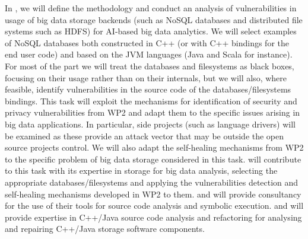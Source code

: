 \begin{Workpackage}{\thewpno}
\begin{Task}
\TaskResults{%
\ref{del:bigdata1},
\ref{del:bigdata2},
\ref{del:bigdata3}
}
\TaskHeader{}
In \theTask, we will define the methodology and conduct an analysis of vulnerabilities in usage of big data storage backends (such as NoSQL databases and distributed file systems such as HDFS) for AI-based big data analytics.  We will select examples of NoSQL databases both constructed in C++ (or with C++ bindings for the end user code) and based on the JVM languages (Java and Scala for instance). For most of the part we will treat the databases and filesystems as black boxes, focusing on their usage rather than on their internals, but we will also, where feasible, identify vulnerabilities in the source code of the databases/filesystems bindings. This task will exploit the mechanisms for identification of security and privacy vulnerabilities from WP2 and adapt them to the specific issues arising in big data applications. In particular, side projects (such as language drivers) will be examined as these provide an attack vector that may be outside the open source projects control. We will also adapt the self-healing mechanisms from WP2 to the specific problem of big data storage considered in this task. 
\UODshort{} will contribute to this task with its expertise in storage for big data analysis, selecting the appropriate databases/filesystems and applying the vulnerabilities detection and self-healing mechanisms developed in WP2 to them. 
\IBMshort{} and \YAGshort{} will provide consultancy for the use of their tools for source code analysis and symbolic execution. 
\UCMshort{} and \USTANshort{} will provide expertise in C++/Java source code analysis and refactoring for analysing and repairing C++/Java storage software components.
 \end{Task}


\end{Workpackage}
